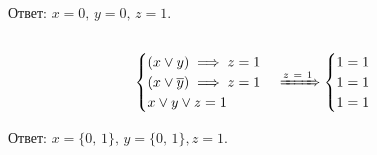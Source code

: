 \documentclass[12pt,a4paper]{article}
\theoremstyle{plain}
\theoremstyle{definition}
\theoremstyle{remark}
\numberwithin{equation}{section}
\begin{document}
  \noindent Ответ: $x=0,\,y=0,\,z=1$.

\subsection{}
  \begin{equation*}
    \begin{cases}
      (x \lor y) \implies z = 1 \\
      (x \lor \overline y) \implies z = 1 \\
      x \lor y \lor z = 1
    \end{cases}
    \xRightarrow{z\ =\ 1}
    \begin{cases}
      1 = 1 \\
      1 = 1 \\
      1 = 1
    \end{cases}
  \end{equation*}

  \noindent Ответ: $x=\{0,\,1\},\,y=\{0,\,1\},z=1$.
\end{document}
